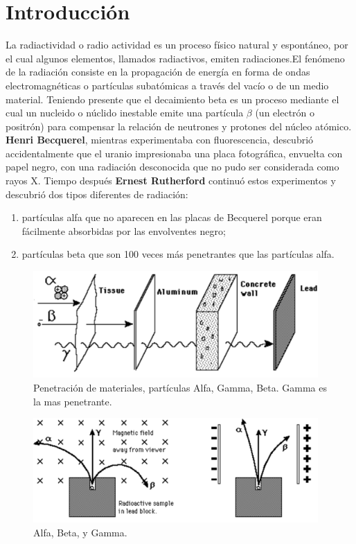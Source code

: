 \documentclass{article}									%
\begin{document}
\section{Introducción}
La radiactividad o radio actividad es un proceso físico natural y espontáneo, por el cual algunos elementos, llamados radiactivos, emiten radiaciones.El fenómeno de la radiación consiste en la propagación de energía en forma de ondas electromagnéticas o partículas subatómicas a través del vacío o de un medio material.
Teniendo presente que el decaimiento beta es un proceso mediante el cual un nucleido o núclido inestable emite una partícula $\beta$ (un electrón o positrón) para compensar la relación de neutrones y protones del núcleo atómico. \textbf{Henri Becquerel}, mientras experimentaba con fluorescencia, descubrió accidentalmente que el uranio impresionaba una placa fotográfica, envuelta con papel negro, con una radiación desconocida que no pudo ser considerada como rayos X. \newline
Tiempo después \textbf{Ernest Rutherford} continuó estos experimentos y descubrió dos tipos diferentes de radiación:
\begin{enumerate}
\item partículas alfa que no aparecen en las placas de Becquerel porque eran fácilmente absorbidas por las envolventes negro;
\item partículas beta que son 100 veces más penetrantes que las partículas alfa.
\end{enumerate}
\begin{figure}[H]
  \centering
     \includegraphics[width=0.97\textwidth]{radpen}
  \caption{Penetración de materiales, partículas Alfa, Gamma, Beta. Gamma es la mas penetrante.}
      \label{fig:penetracion}
\end{figure}
\begin{figure}[H]
  \centering
     \includegraphics[width=0.97\textwidth]{alpbet}
  \caption{Alfa, Beta, y Gamma.}
      \label{fig:particulas}
\end{figure}
\end{document}

